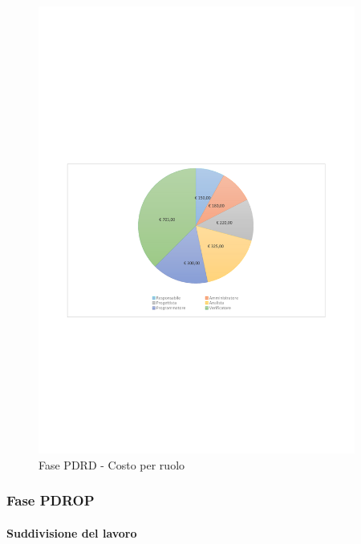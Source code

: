 \documentclass[../PianoProgetto.tex]{subfiles}
\begin{document}
	\begin{figure}[H]
		\centering
		\includegraphics[width=0.93\textwidth , trim=1.5cm 9cm 1.5cm 9cm]{grafici/PDRD/PDRD-costo}
			\caption{Fase PDRD - Costo per ruolo}
		\label{fig:CircleChart-fasePDRD_costo_r}
	\end{figure}
\vfill
	
	\subsubsection{Fase PDROP}
				\paragraph{Suddivisione del lavoro}\
						
\end{document}
